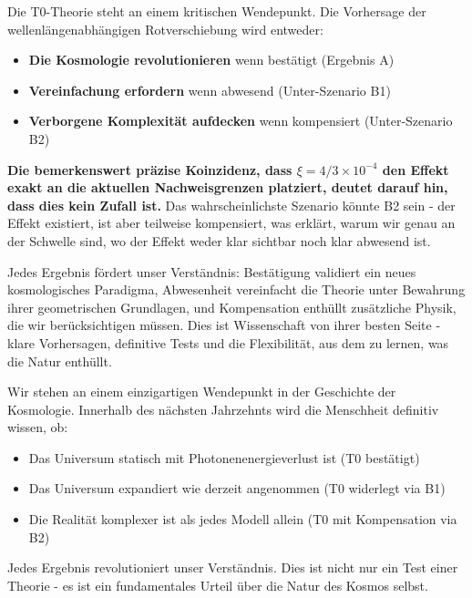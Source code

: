 \documentclass[12pt,a4paper]{article}
\theoremstyle{definition}
\begin{document}
	Die T0-Theorie steht an einem kritischen Wendepunkt. Die Vorhersage der wellenl\"angenabh\"angigen Rotverschiebung wird entweder:
	
	\begin{itemize}
		\item \textbf{Die Kosmologie revolutionieren} wenn best\"atigt (Ergebnis A)
		\item \textbf{Vereinfachung erfordern} wenn abwesend (Unter-Szenario B1)
		\item \textbf{Verborgene Komplexit\"at aufdecken} wenn kompensiert (Unter-Szenario B2)
	\end{itemize}
	
	\begin{important}[title=Kritische Einsicht: Das Koinzidenzproblem]
		\textbf{Die bemerkenswert pr\"azise Koinzidenz, dass $\xi = 4/3 \times 10^{-4}$ den Effekt exakt an die aktuellen Nachweisgrenzen platziert, deutet darauf hin, dass dies kein Zufall ist.} Das wahrscheinlichste Szenario k\"onnte B2 sein - der Effekt existiert, ist aber teilweise kompensiert, was erkl\"art, warum wir genau an der Schwelle sind, wo der Effekt weder klar sichtbar noch klar abwesend ist.
	\end{important}
	
	Jedes Ergebnis f\"ordert unser Verst\"andnis: Best\"atigung validiert ein neues kosmologisches Paradigma, Abwesenheit vereinfacht die Theorie unter Bewahrung ihrer geometrischen Grundlagen, und Kompensation enth\"ullt zus\"atzliche Physik, die wir ber\"ucksichtigen m\"ussen. Dies ist Wissenschaft von ihrer besten Seite - klare Vorhersagen, definitive Tests und die Flexibilit\"at, aus dem zu lernen, was die Natur enth\"ullt.
	
	\begin{revolutionary}[title=Ein historischer Moment in der Physik]
		Wir stehen an einem einzigartigen Wendepunkt in der Geschichte der Kosmologie. Innerhalb des n\"achsten Jahrzehnts wird die Menschheit definitiv wissen, ob:
		\begin{itemize}
			\item Das Universum statisch mit Photonenenergieverlust ist (T0 best\"atigt)
			\item Das Universum expandiert wie derzeit angenommen (T0 widerlegt via B1)
			\item Die Realit\"at komplexer ist als jedes Modell allein (T0 mit Kompensation via B2)
		\end{itemize}
		Jedes Ergebnis revolutioniert unser Verst\"andnis. Dies ist nicht nur ein Test einer Theorie - es ist ein fundamentales Urteil \"uber die Natur des Kosmos selbst.
	\end{revolutionary}
	
\end{document}
